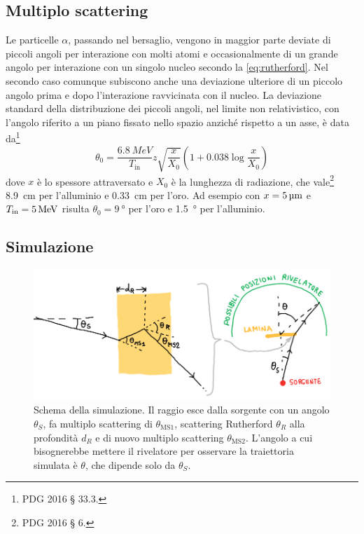 \subsection{Multiplo scattering}

Le particelle $\alpha$, passando nel bersaglio,
vengono in maggior parte deviate di piccoli angoli per interazione con molti atomi
e occasionalmente di un grande angolo per interazione con un singolo nucleo secondo la \eqref{eq:rutherford}.
Nel secondo caso comunque subiscono anche una deviazione ulteriore di un piccolo angolo
prima e dopo l'interazione ravvicinata con il nucleo.
La deviazione standard della distribuzione dei piccoli angoli,
nel limite non relativistico,
con l'angolo riferito a un piano fissato nello spazio anziché rispetto a un asse,
è data da\footnote{PDG 2016 \S{} 33.3.}
\begin{equation}
	\label{eq:ms}
	\theta_0 = \frac {\SI{6.8}{MeV}} {T_\text{in}} z \sqrt{\frac{x}{X_0}} \left(1+0.038\log\frac x{X_0}\right)
\end{equation}
dove $x$ è lo spessore attraversato e $X_0$ è la lunghezza di radiazione,
che vale\footnote{PDG 2016 \S{} 6.} \SI{8.9}{cm} per l'alluminio e \SI{0.33}{cm} per l'oro.
Ad esempio con $x = \SI5{\micro m}$ e $T_\text{in} = \SI5{MeV}$
risulta $\theta_0 = \SI{9}\degree$ per l'oro e \SI{1.5}{\degree} per l'alluminio.

\subsection{Simulazione}

\begin{figure}
	\centering
	\includegraphics[width=\textwidth]{immagini/schemamc}
	\caption{\label{fig:schemamc}
	Schema della simulazione.
	Il raggio esce dalla sorgente con un angolo $\theta_S$,
	fa multiplo scattering di $\theta_\text{MS1}$,
	scattering Rutherford $\theta_R$ alla profondità $d_R$
	e di nuovo multiplo scattering $\theta_\text{MS2}$.
	L'angolo a cui bisognerebbe mettere il rivelatore per osservare la traiettoria simulata è $\theta$,
	che dipende solo da $\theta_S$.}
\end{figure}

